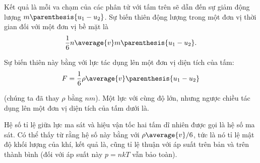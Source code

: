 Kết quả là mỗi va chạm của các phân tử với tấm trên sẽ dẫn đến sự giảm động lượng $m\parenthesis{u_1-u_2}$. Sự biến thiên động lượng trong một đơn vị thời gian đối với một đơn vị bề mặt là
\begin{equation*}
    \frac{1}{6} n \average{v} m \parenthesis{u_1-u_2}.
\end{equation*}

\noindent
Sự biến thiên này bằng với lực tác dụng lên một đơn vị diện tích của tấm:
\begin{equation}\label{eq:16_31}
    F = \frac{1}{6} \rho \average{v} \parenthesis{u_1-u_2}
\end{equation}

\noindent
(chúng ta đã thay $\rho$ bằng $nm$). Một lực với cùng độ lớn, nhưng ngược chiều tác dụng lên một đơn vị diện tích của tấm dưới là.

Hệ số tỉ lệ giữa lực ma sát và hiệu vận tốc hai tấm dĩ nhiên được gọi là hệ số ma sát. Có thể thấy từ  rằng hệ số này bằng với $\rho\average{v}/6$, tức là nó tỉ lệ mật độ khối lượng của khí, kết quả là, cũng tỉ lệ thuận với áp suất trên bản và trên thành bình (đối với áp suất này $p=nkT$ vẫn bảo toàn).

